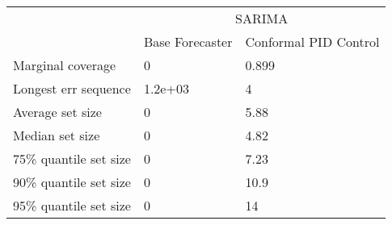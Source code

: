 \begin{tabular}{lll}
\toprule
& \multicolumn{2}{c}{SARIMA} \\
& Base Forecaster & Conformal PID Control \\
\midrule
Marginal coverage & 0 & 0.899 \\
Longest err sequence & 1.2e+03 & 4 \\
Average set size & 0 & 5.88 \\
Median set size & 0 & 4.82 \\
75\% quantile set size & 0 & 7.23 \\
90\% quantile set size & 0 & 10.9 \\
95\% quantile set size & 0 & 14 \\
\bottomrule
\end{tabular}
